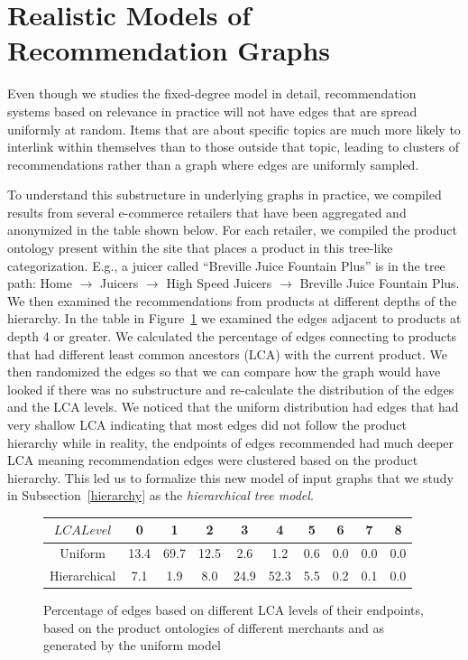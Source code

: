 \section{Realistic Models of Recommendation Graphs}
Even though we studies the fixed-degree model in detail, recommendation systems based on relevance in practice
will not have edges that are spread uniformly at random. Items that are
about specific topics are much more likely to interlink within
themselves than to those outside that topic, leading to
clusters of recommendations rather than a graph where edges are
uniformly sampled.

To understand this substructure in underlying
graphs in practice, we compiled results from several e-commerce retailers that
have been aggregated and anonymized in the table shown below. For each
retailer, we compiled the product ontology present within the
site that places a product in this tree-like categorization. E.g., a
juicer called ``Breville Juice Fountain Plus'' is in the tree path:
Home $\rightarrow$ Juicers $\rightarrow$ High Speed Juicers
$\rightarrow$ Breville Juice Fountain Plus. We then examined the
recommendations from products at different depths of the hierarchy. In
the table in Figure~\ref{fig:hier} we examined the edges adjacent to
products at depth 4 or greater. We calculated the percentage of edges
connecting to products that had different least common ancestors (LCA) with the current product.  We
then randomized the edges so that we can compare how the graph would
have looked if there was no substructure and re-calculate the
distribution of the edges and the LCA levels. We noticed that the
uniform distribution had edges that had very shallow LCA indicating that 
most edges did not follow the product hierarchy while in reality,
the endpoints of edges recommended had much deeper LCA meaning recommendation edges were clustered based on the product hierarchy. This led us
to formalize this new model of input graphs that we study in Subsection~\ref{hierarchy}
as the {\em hierarchical tree model}.

\begin{figure}[h]
  \centering
  \begin{tabular}{ |c|c|c|c|c|c|c|c|c|c| }
    \hline
    $LCA Level$ & 0 & 1 & 2 & 3 & 4 & 5 & 6 & 7 & 8 \\ \hline
    Uniform & 13.4 & 69.7 & 12.5 & 2.6 & 1.2 & 0.6 & 0.0 & 0.0 & 0.0 \\ \hline
    Hierarchical & 7.1 & 1.9 & 8.0 & 24.9 & 52.3 & 5.5 & 0.2 & 0.1 & 0.0 \\
    \hline
  \end{tabular}
  \caption{Percentage of edges based on different LCA levels of their endpoints, based on the product ontologies of different merchants and as generated by the uniform model}\label{fig:hier}
\end{figure}

